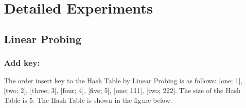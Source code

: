 \pagebreak
\section{Detailed Experiments}
\label{sec:detailedExperiments}

\subsection{Linear Probing}


\subsubsection{Add key:}
The order insert key to the Hash Table by Linear Probing is as follows: [one; 1], [two; 2], [three; 3], [four; 4], [five; 5], [one; 111], [two; 222]. The size of the Hash Table is 5. The Hash Table is shown in the figure below:

